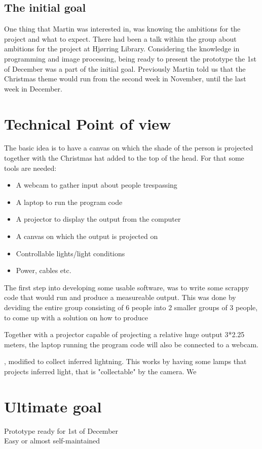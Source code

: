 \subsection{The initial goal}
One thing that Martin was interested in, was knowing the ambitions for the project and what to expect. There had been a talk within the group about ambitions for the project at Hjørring Library. Considering the knowledge in programming and image processing, being ready to present the prototype the 1st of December was a part of the initial goal. Previously Martin told us that the Christmas theme would run from the second week in November, until the last week in December.



\section{Technical Point of view}
The basic idea is to have a canvas on which the shade of the person is projected together with the Christmas hat added to the top of the head. For that some tools are needed:

\begin{itemize}
\item A webcam to gather input about people trespassing
\item A laptop to run the program code
\item A projector to display the output from the computer
\item A canvas on which the output is projected on
\item Controllable lights/light conditions
\item Power, cables etc.
\end{itemize}

The first step into developing some usable software, was to write some scrappy code that would run and produce a measureable output. This was done by deviding the entire group consisting of 6 people into 2 smaller groups of 3 people, to come up with a solution on how to produce 

Together with a projector capable of projecting a relative huge output 3*2.25 meters, the laptop running the program code will also be connected to a webcam. 

, modified to collect inferred lightning. This works by having some lamps that projects inferred light, that is "collectable" by the camera. We 

\section{Ultimate goal}
Prototype ready for 1st of December\\
Easy or almost self-maintained
